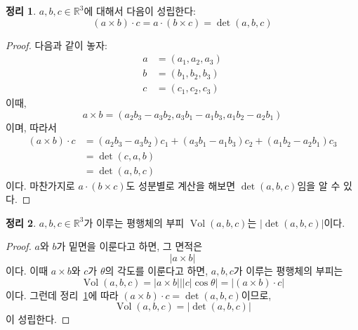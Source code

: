 \documentclass[unfonts,oneside,a4paper]{oblivoir}
\theoremstyle{definition}
\theoremstyle{theorem}
\newtheorem{theorem}{정리}[section]
\theoremstyle{theorem}
\theoremstyle{remark}
\theoremstyle{remark}
\theoremstyle{remark}
\theoremstyle{remark}
\renewcommand{\vec}[1]{\bm{\mathit{#1}}}
\DeclareMathOperator{\Vol}{Vol}
\begin{document}
\begin{theorem} \label{thm:vec_prod_det}
    $\vec a, \vec b, \vec c \in \mathbb R^3$에 대해서 다음이 성립한다:
    \begin{equation*}
        (\vec a \times \vec b) \cdot \vec c = \vec a \cdot (\vec b \times \vec c) = \det(\vec a, \vec b, \vec c)
    \end{equation*}
\end{theorem}
\begin{proof}
    다음과 같이 놓자:
    \begin{align*}
        \vec a &= (a_1, a_2, a_3)\\
        \vec b &= (b_1, b_2, b_3)\\
        \vec c &= (c_1, c_2, c_3)
    \end{align*}
    이때,
    \begin{equation*}
        \vec a \times \vec b = (a_2 b_3 - a_3 b_2, a_3 b_1 - a_1 b_3, a_1 b_2 - a_2 b_1)
    \end{equation*}
    이며, 따라서
    \begin{align*}
        (\vec a \times \vec b) \cdot \vec c &= (a_2 b_3 - a_3 b_2) c_1 + (a_3 b_1 - a_1 b_3) c_2 + (a_1 b_2 - a_2 b_1) c_3\\
                                            &= \det(\vec c, \vec a, \vec b)\\
                                            &= \det(\vec a, \vec b, \vec c)
    \end{align*}
    이다.
    마찬가지로 $\vec a \cdot (\vec b \times \vec c)$도 성분별로 계산을 해보면 $\det(\vec a, \vec b, \vec c)$임을 알 수 있다.
\end{proof}

\begin{theorem}
    $\vec a, \vec b, \vec c \in \mathbb R^3$가 이루는 평행체의 부피 $\Vol (\vec a, \vec b, \vec c)$는 $\lvert\det(\vec a, \vec b, \vec c)\rvert$이다.
\end{theorem}
\begin{proof}
    $\vec a$와 $\vec b$가 밑면을 이룬다고 하면, 그 면적은
    \begin{equation*}
        |\vec a \times \vec b|
    \end{equation*}
    이다.
    이때 $\vec a \times \vec b$와 $\vec c$가 $\theta$의 각도를 이룬다고 하면, $\vec a, \vec b, \vec c$가 이루는 평행체의 부피는
    \begin{equation*}
        \Vol(\vec a, \vec b, \vec c) = |\vec a \times \vec b| \bigl| |\vec c| \cos \theta \bigr| = |(\vec a \times \vec b) \cdot \vec c|
    \end{equation*}
    이다.
    그런데 정리~\ref{thm:vec_prod_det}에 따라 $(\vec a \times \vec b) \cdot \vec c = \det (\vec a, \vec b, \vec c)$이므로,
    \begin{equation*}
        \Vol(\vec a, \vec b, \vec c) = \lvert\det(\vec a, \vec b, \vec c)\rvert
    \end{equation*}
    이 성립한다.
\end{proof}
\end{document}
